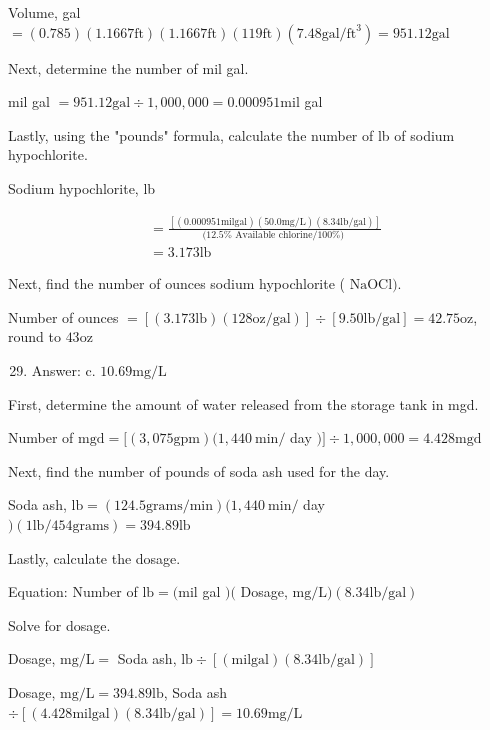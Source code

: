 \documentclass[10pt]{article}
\begin{document}
Volume, gal $=(0.785)(1.1667 \mathrm{ft})(1.1667 \mathrm{ft})(119 \mathrm{ft})\left(7.48 \mathrm{gal} / \mathrm{ft}^{3}\right)=951.12 \mathrm{gal}$

Next, determine the number of mil gal.

mil gal $=951.12 \mathrm{gal} \div 1,000,000=0.000951 \mathrm{mil}$ gal

Lastly, using the "pounds" formula, calculate the number of lb of sodium hypochlorite.

Sodium hypochlorite, lb

$$
\begin{aligned}
&=\frac{[(0.000951 \mathrm{mil} \mathrm{gal})(50.0 \mathrm{mg} / \mathrm{L})(8.34 \mathrm{lb} / \mathrm{gal})]}{(12.5 \% \text { Available chlorine/100\%) }} \\
&=3.173 \mathrm{lb}
\end{aligned}
$$

Next, find the number of ounces sodium hypochlorite ( $\mathrm{NaOCl})$.

Number of ounces $=[(3.173 \mathrm{lb})(128 \mathrm{oz} / \mathrm{gal})] \div[9.50 \mathrm{lb} / \mathrm{gal}]=42.75 \mathrm{oz}$, round to $43 \mathrm{oz}$

\begin{enumerate}
  \setcounter{enumi}{28}
  \item Answer: c. $10.69 \mathrm{mg} / \mathrm{L}$
\end{enumerate}

First, determine the amount of water released from the storage tank in mgd.

Number of $\mathrm{mgd}=[(3,075 \mathrm{gpm})(1,440 \mathrm{~min} /$ day $)] \div 1,000,000=4.428 \mathrm{mgd}$

Next, find the number of pounds of soda ash used for the day.

Soda ash, $\mathrm{lb}=(124.5 \mathrm{grams} / \mathrm{min})(1,440 \mathrm{~min} /$ day $)(1 \mathrm{lb} / 454 \mathrm{grams})=394.89 \mathrm{lb}$

Lastly, calculate the dosage.

Equation: Number of $\mathrm{lb}=(\mathrm{mil}$ gal $)($ Dosage, $\mathrm{mg} / \mathrm{L})(8.34 \mathrm{lb} / \mathrm{gal})$

Solve for dosage.

Dosage, $\mathrm{mg} / \mathrm{L}=$ Soda ash, $\mathrm{lb} \div[(\mathrm{mil} \mathrm{gal})(8.34 \mathrm{lb} / \mathrm{gal})]$

Dosage, $\mathrm{mg} / \mathrm{L}=394.89 \mathrm{lb}$, Soda ash $\div[(4.428 \mathrm{mil} \mathrm{gal})(8.34 \mathrm{lb} / \mathrm{gal})]=10.69 \mathrm{mg} / \mathrm{L}$
\end{document}

